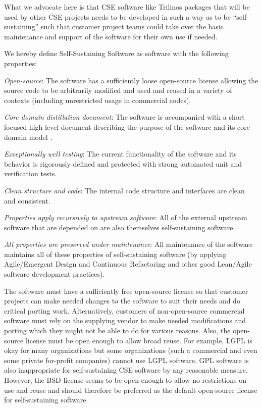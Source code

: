 \documentclass[11pt]{SANDreport}
\begin{document}
What we advocate here is that CSE software like Trilinos packages that
will be used by other CSE projects needs to be developed in such a way
as to be ``self-sustaining'' such that customer project teams could
take over the basic maintenance and support of the software for their
own use if needed.

We hereby define Self-Sustaining Software as software with the
following properties:
%
\begin{compactitem}

{}\item\textit{Open-source}: The software has a sufficiently loose
open-source license allowing the source code to be arbitrarily modified
and used and reused in a variety of contexts (including unrestricted
usage in commercial codes).

{}\item\textit{Core domain distillation document}: The software is
accompanied with a short focused high-level document describing the
purpose of the software and its core domain model
{}\cite{DomainDrivenDesign}.

{}\item\textit{Exceptionally well testing}: The current functionality
of the software and its behavior is rigorously defined and protected
with strong automated unit and verification tests.

{}\item\textit{Clean structure and code}: The internal code structure
and interfaces are clean and consistent.

{}\item\textit{Properties apply recursively to upstream software}: All
of the external upstream software that are depended on are also
themselves self-sustaining software.

{}\item\textit{All properties are preserved under maintenance}: All
maintenance of the software maintains all of these properties of
self-sustaining software (by applying Agile/Emergent Design and
Continuous Refactoring and other good Lean/Agile software development
practices).

\end{compactitem}

The software must have a sufficiently free open-source license so that
customer projects can make needed changes to the software to suit
their needs and do critical porting work.  Alternatively, customers of
non-open-source commercial software must rely on the supplying vendor
to make needed modifications and porting which they might not be able
to do for various reasons.  Also, the open-source license must be open
enough to allow broad reuse.  For example, LGPL is okay for many
organizations but some organizations (such a commercial and even some
private for-profit companies) cannot use LGPL software.  GPL software
is also inappropriate for self-sustaining CSE software by any
reasonable measure.  However, the BSD license seems to be open enough
to allow no restrictions on use and reuse and should therefore be
preferred as the default open-source license for self-sustaining
software.
\end{document}
